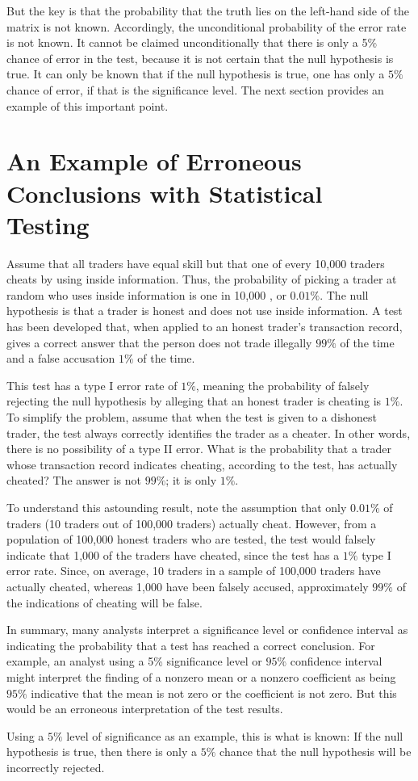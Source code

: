 \documentclass[11pt]{article}
\begin{document}
But the key is that the probability that the truth lies on the left-hand side of the matrix is not known. Accordingly, the unconditional probability of the error rate is not known. It cannot be claimed unconditionally that there is only a 5\% chance of error in the test, because it is not certain that the null hypothesis is true. It can only be known that if the null hypothesis is true, one has only a $5 \%$ chance of error, if that is the significance level. The next section provides an example of this important point.

\section*{An Example of Erroneous Conclusions with Statistical Testing}
Assume that all traders have equal skill but that one of every 10,000 traders cheats by using inside information. Thus, the probability of picking a trader at random who uses inside information is one in 10,000 , or $0.01 \%$. The null hypothesis is that a trader is honest and does not use inside information. A test has been developed that, when applied to an honest trader's transaction record, gives a correct answer that the person does not trade illegally $99 \%$ of the time and a false accusation $1 \%$ of the time.

This test has a type I error rate of $1 \%$, meaning the probability of falsely rejecting the null hypothesis by alleging that an honest trader is cheating is $1 \%$. To simplify the problem, assume that when the test is given to a dishonest trader, the test always correctly identifies the trader as a cheater. In other words, there is no possibility of a type II error. What is the probability that a trader whose transaction record indicates cheating, according to the test, has actually cheated? The answer is not $99 \%$; it is only $1 \%$.

To understand this astounding result, note the assumption that only $0.01 \%$ of traders (10 traders out of 100,000 traders) actually cheat. However, from a population of 100,000 honest traders who are tested, the test would falsely indicate that 1,000 of the traders have cheated, since the test has a $1 \%$ type I error rate. Since, on average, 10 traders in a sample of 100,000 traders have actually cheated, whereas 1,000 have been falsely accused, approximately $99 \%$ of the indications of cheating will be false.

In summary, many analysts interpret a significance level or confidence interval as indicating the probability that a test has reached a correct conclusion. For example, an analyst using a 5\% significance level or $95 \%$ confidence interval might interpret the finding of a nonzero mean or a nonzero coefficient as being $95 \%$ indicative that the mean is not zero or the coefficient is not zero. But this would be an erroneous interpretation of the test results.

Using a $5 \%$ level of significance as an example, this is what is known: If the null hypothesis is true, then there is only a $5 \%$ chance that the null hypothesis will be incorrectly rejected.
\end{document}
